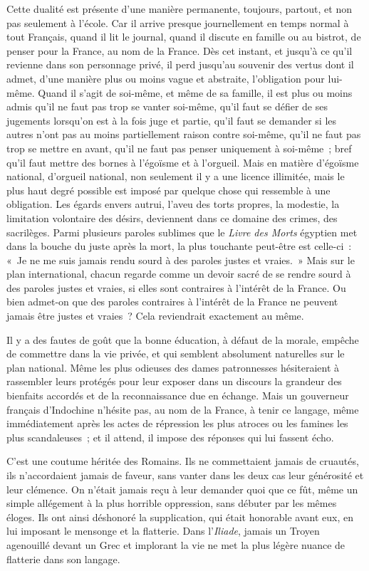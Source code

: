 \documentclass[french,twoside]{book} %
\begin{document}
Cette dualité est présente d'une manière permanente, toujours, partout, et non pas seulement à l'école. Car il arrive presque journellement en temps normal à tout Français, quand il lit le journal, quand il discute en famille ou au bistrot, de penser pour la France, au nom de la France. Dès cet instant, et jusqu'à ce qu'il revienne dans son personnage privé, il perd jusqu'au souvenir des vertus dont il admet, d'une manière plus ou moins vague et abstraite, l'obligation pour lui-même. Quand il s'agit de soi-même, et même de sa famille, il est plus ou moins admis qu'il ne faut pas trop se vanter soi-même, qu'il faut se défier de ses jugements lorsqu'on est à la fois juge et partie, qu'il faut se demander si les autres n'ont pas au moins partiellement raison contre soi-même, qu'il ne faut pas trop se mettre en avant, qu'il ne faut pas penser uniquement à soi-même ; bref qu'il faut mettre des bornes à l'égoïsme et à l'orgueil. Mais en matière d'égoïsme national, d'orgueil national, non seulement il y a une licence illimitée, mais le plus haut degré possible est imposé par quelque chose qui ressemble à une obligation. Les égards envers autrui, l'aveu des torts propres, la modestie, la limitation volontaire des désirs, deviennent dans ce domaine des crimes, des sacrilèges. Parmi plusieurs paroles sublimes que le {\itshape Livre des Morts} égyptien met dans la bouche du juste après la mort, la plus touchante peut-être est celle-ci : « Je ne me suis jamais rendu sourd à des paroles justes et vraies. » Mais sur le plan international, chacun regarde comme un devoir sacré de se rendre sourd à des paroles justes et vraies, si elles sont contraires à l'intérêt de la France. Ou bien admet-on que des paroles contraires à l'intérêt de la France ne peuvent jamais être justes et vraies ? Cela reviendrait exactement au même.\par
Il y a des fautes de goût que la bonne éducation, à défaut de la morale, empêche de commettre dans la vie privée, et qui semblent absolument naturelles sur le plan national. Même les plus odieuses des dames patronnesses hésiteraient à rassembler leurs protégés pour leur exposer dans un discours la grandeur des bienfaits accordés et de la reconnaissance due en échange. Mais un gouverneur français d'Indochine n'hésite pas, au nom de la France, à tenir ce langage, même immédiatement après les actes de répression les plus atroces ou les famines les plus scandaleuses ; et il attend, il impose des réponses qui lui fassent écho.\par
C'est une coutume héritée des Romains. Ils ne commettaient jamais de cruautés, ils n'accordaient jamais de faveur, sans vanter dans les deux cas leur générosité et leur clémence. On n'était jamais reçu à leur demander quoi que ce fût, même un simple allégement à la plus horrible oppression, sans débuter par les mêmes éloges. Ils ont ainsi déshonoré la supplication, qui était honorable avant eux, en lui imposant le mensonge et la flatterie. Dans l'{\itshape Iliade}, jamais un Troyen agenouillé devant un Grec et implorant la vie ne met la plus légère nuance de flatterie dans son langage.\par
\end{document}
